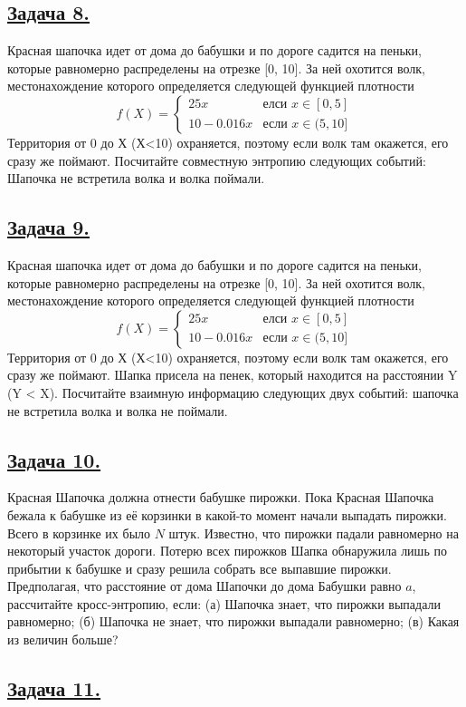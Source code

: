 \subsection*{\hyperref[sec:sol_problem8]{Задача 8.}}\label{sec:problem8} Красная шапочка идет от дома до бабушки и по дороге садится на пеньки, которые равномерно распределены на отрезке [0, 10]. За ней охотится волк, местонахождение которого определяется следующей функцией плотности $$\begin{equation*}
f(X) = 
 \begin{cases}
   25x &\text{елси $x \in [0, 5]$}\\
   10 - 0.016x &\text{если $x \in (5, 10]$}
 \end{cases}
\end{equation*}$$
Территория от 0 до Х (Х<10) охраняется, поэтому если волк там окажется, его сразу же поймают. Посчитайте совместную энтропию следующих событий: Шапочка не встретила волка и волка поймали. 

\subsection*{\hyperref[sec:sol_problem9]{Задача 9.}}\label{sec:problem9} Красная шапочка идет от дома до бабушки и по дороге садится на пеньки, которые равномерно распределены на отрезке [0, 10]. За ней охотится волк, местонахождение которого определяется следующей функцией плотности $$\begin{equation*}
f(X) = 
 \begin{cases}
   25x &\text{елси $x \in [0, 5]$}\\
   10 - 0.016x &\text{если $x \in (5, 10]$}
 \end{cases}
\end{equation*}$$ 
Территория от 0 до Х (Х<10) охраняется, поэтому если волк там окажется, его сразу же поймают. Шапка присела на пенек, который находится на расстоянии Y (Y < X). Посчитайте взаимную информацию следующих двух событий: шапочка не встретила волка и волка не поймали. 
 
\subsection*{\hyperref[sec:sol_problem10]{Задача 10.}}\label{sec:problem10} Красная Шапочка должна отнести бабушке пирожки. Пока Красная Шапочка бежала к бабушке из её корзинки в какой-то момент начали выпадать пирожки. Всего в корзинке их было $N$ штук. Известно, что пирожки падали равномерно на некоторый участок дороги. Потерю всех пирожков Шапка обнаружила лишь по прибытии к бабушке и сразу решила собрать все выпавшие пирожки. Предполагая, что расстояние от дома Шапочки до дома Бабушки равно $a$, рассчитайте кросс-энтропию, если:
(а) Шапочка знает, что пирожки выпадали равномерно;
(б) Шапочка не знает, что пирожки выпадали равномерно;
(в) Какая из величин больше?

\subsection*{\hyperref[sec:sol_problem11]{Задача 11.}}\label{sec:problem11}
